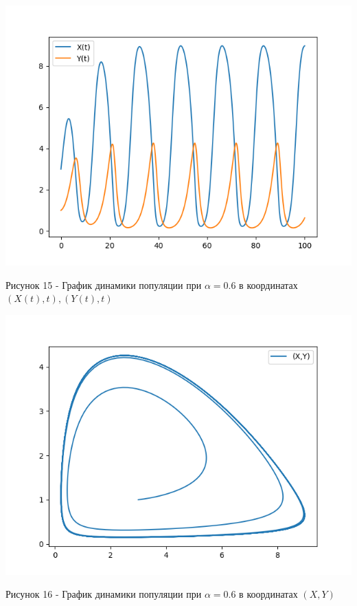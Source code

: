 \documentclass[a4paper,14pt]{extreport}
\begin{document}
\begin{center}
    \begin{minipage}[htb]{0.8\linewidth}
    \includegraphics[width=14cm]{n10.png}
    \end{minipage}
    \end{center}
    \begin{center}
        Рисунок 15 - График динамики популяции при $\alpha = 0.6$ в координатах $(X(t),t),(Y(t),t)$
    \end{center}
    \begin{center}
    \begin{minipage}[htb]{0.8\linewidth}
    \includegraphics[width=14cm]{10.png}
    \end{minipage}
    \end{center}
    \begin{center}
        Рисунок 16 - График динамики популяции при $\alpha = 0.6$ в координатах $(X,Y)$  
    \end{center}
\end{document}
